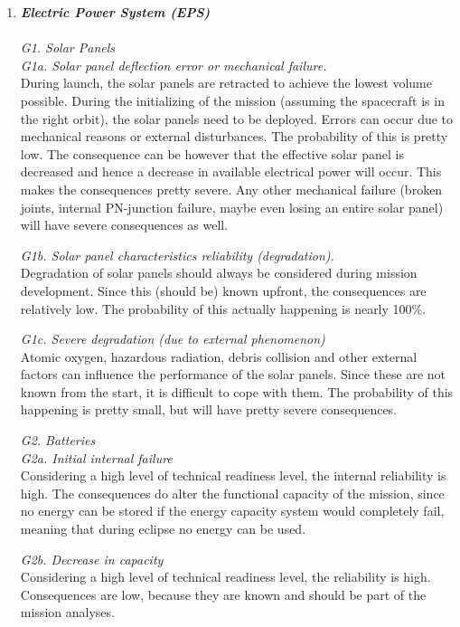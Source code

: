 \begin{enumerate}[A]
	\item  \textbf{\textit{Electric Power System (EPS)}} \\\\
\textit{G1. Solar Panels}\\

\textit{G1a. Solar panel deflection error or mechanical failure.}\\ 
During launch, the solar panels are retracted to achieve the lowest volume possible. During the initializing of the mission (assuming the spacecraft is in the right orbit), the solar panels need to be deployed. Errors can occur due to mechanical reasons or external disturbances. The probability of this is pretty low. The consequence can be however that the effective solar panel is decreased and hence a decrease in available electrical power will occur. This makes the consequences pretty severe. Any other mechanical failure (broken joints, internal PN-junction failure, maybe even losing an entire solar panel) will have severe consequences as well. 

\textit{G1b. Solar panel characteristics reliability (degradation).}\\ Degradation of solar panels should always be considered during mission development. Since this (should be) known upfront, the consequences are relatively low. The probability of this actually happening is nearly 100\%.

\textit{G1c. Severe degradation (due to external phenomenon)}\\ 
Atomic oxygen, hazardous radiation, debris collision and other external factors can influence the performance of the solar panels. Since these are not known from the start, it is difficult to cope with them. The probability of this happening is pretty small, but will have pretty severe consequences.

\textit{G2. Batteries}\\

\textit{G2a. Initial internal failure}\\ 
Considering a high level of technical readiness level, the internal reliability is high. The consequences do alter the functional capacity of the mission, since no energy can be stored if the energy capacity system would completely fail, meaning that during eclipse no energy can be used. 

\textit{G2b. Decrease in capacity}\\ 
Considering a high level of technical readiness level, the reliability is high. Consequences are low, because they are known and should be part of the mission analyses.


\end{enumerate}
